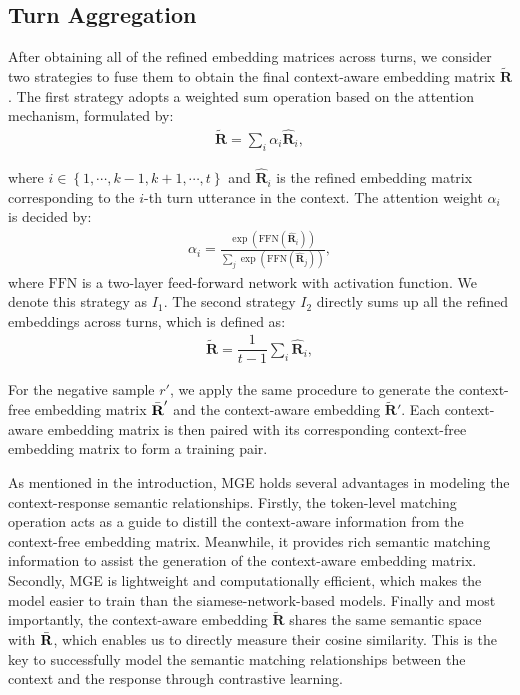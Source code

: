 \documentclass[11pt]{article}
\begin{document}
\subsection{Turn Aggregation}
After obtaining all of the refined embedding matrices across turns, we consider two strategies to fuse them to obtain the final context-aware embedding matrix $\tilde{\textbf{R}}$.
The first strategy adopts a weighted sum operation based on the attention mechanism, formulated by:
\begin{align}
  \tilde{\textbf{R}} = \sum_{i} \alpha_{i} \hat{\textbf{R}}_{i},
\end{align}

where $i \in \left \{1, \cdots, k-1, k+1, \cdots, t \right \}$ and $\hat{\textbf{R}}_{i}$ is the refined embedding matrix corresponding to the $i$-th turn utterance in the context. 
The attention weight $\alpha_{i}$ is decided by:
\begin{align}
  \label{align:weighted pooling operation}
  \alpha_{i} = \frac{\exp(\text{FFN}(\hat{\textbf{R}}_{i}))}{\sum_{j}\exp( \text{FFN}(\hat{\textbf{R}}_{j}))},
\end{align}
where $\text{FFN}$ is a two-layer feed-forward network with  \cite{relu} activation function.
We denote this strategy as $I_{1}$.
The second strategy $I_{2}$ directly sums up all the refined embeddings across turns, which is defined as:
\begin{align}
  \tilde{\textbf{R}} = \dfrac{1}{t-1}\sum_{i} \hat{\textbf{R}}_{i},
\end{align}

For the negative sample $r'$, we apply the same procedure to generate the context-free embedding matrix $\Bar{\textbf{R}}'$ and the context-aware embedding $\tilde{\textbf{R}}'$.
Each context-aware embedding matrix is then paired with its corresponding context-free embedding matrix to form a training pair.

As mentioned in the introduction, MGE holds several advantages in modeling the context-response semantic relationships.
Firstly, the token-level matching operation acts as a guide to distill the context-aware information from the context-free embedding matrix.
Meanwhile, it provides rich semantic matching information to assist the generation of the context-aware embedding matrix.
Secondly, MGE is lightweight and computationally efficient, which makes the model easier to train than the siamese-network-based models.
Finally and most importantly, the context-aware embedding $\tilde{\textbf{R}}$ shares the same semantic space with $\Bar{\textbf{R}}$, which enables us to directly measure their cosine similarity.
This is the key to successfully model the semantic matching relationships between the context and the response through contrastive learning.
\end{document}
